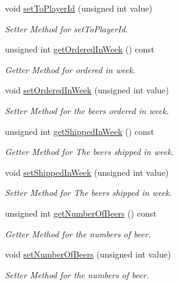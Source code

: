 \begin{DoxyCompactItemize}
void \hyperlink{classPlayerEvent_ab867bb56d8a0cbf9c701a12f8c48987d}{set\+To\+Player\+Id} (unsigned int value)
\begin{DoxyCompactList}\small\item\em Setter Method for set\+To\+Player\+Id. \end{DoxyCompactList}\item 
unsigned int \hyperlink{classPlayerEvent_a9b9f5598c419cebae94fed31d209a09b}{get\+Ordered\+In\+Week} () const
\begin{DoxyCompactList}\small\item\em Getter Method for ordered in week. \end{DoxyCompactList}\item 
void \hyperlink{classPlayerEvent_ab6c0f61508410d40ff485de1c76095f1}{set\+Ordered\+In\+Week} (unsigned int value)
\begin{DoxyCompactList}\small\item\em Setter Method for the beers ordered in week. \end{DoxyCompactList}\item 
unsigned int \hyperlink{classPlayerEvent_ab541b87f6c0de2c990c2602b10d2b7cc}{get\+Shipped\+In\+Week} () const
\begin{DoxyCompactList}\small\item\em Getter Method for The beers shipped in week. \end{DoxyCompactList}\item 
void \hyperlink{classPlayerEvent_ac84be24b1509dfbedce45a78b33426d2}{set\+Shipped\+In\+Week} (unsigned int value)
\begin{DoxyCompactList}\small\item\em Setter Method for The beers shipped in week. \end{DoxyCompactList}\item 
unsigned int \hyperlink{classPlayerEvent_aebdec1d24172c7d3cefa6e76ac51f490}{get\+Number\+Of\+Beers} () const
\begin{DoxyCompactList}\small\item\em Getter Method for the numbers of beer. \end{DoxyCompactList}\item 
void \hyperlink{classPlayerEvent_a8c210ab3387262a7ecb17b16fe049593}{set\+Number\+Of\+Beers} (unsigned int value)
\begin{DoxyCompactList}\small\item\em Setter Method for the numbers of beer. \end{DoxyCompactList}\end{DoxyCompactItemize}
